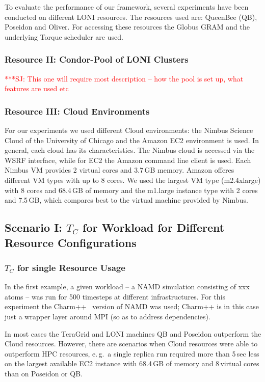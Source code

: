 \documentclass[conference,final]{IEEEtran}
\newcommand{\tc}{$T_{C}$ }
\newcommand{\jhanote}[1]{ {\textcolor{red} { ***SJ: #1 }}}
\newcommand{\jhanote}[1]{}
\begin{document}
To evaluate the performance of our framework, several experiments 
have been conducted on different LONI resources. The resources used are: 
QueenBee (QB), Poseidon and Oliver. For accessing these resources
the Globus GRAM and the underlying Torque scheduler are used.

\subsubsection*{Resource II: Condor-Pool of LONI Clusters}

\jhanote{This one will require most description -- how the pool is set
up, what features are used etc}

\subsubsection*{Resource III: Cloud Environments}

For our experiments we used different Cloud environments: 
the Nimbus Science Cloud of the University of Chicago and the 
Amazon EC2 environment is used. In general, each cloud has 
its characteristics. The Nimbus cloud is accessed via the WSRF
interface, while for EC2 the Amazon command line 
client is used. Each Nimbus VM provides 2 virtual cores and 3.7\,GB memory. 
Amazon offeres different VM types with up to 8 cores. We used 
the largest VM type (m2.4xlarge) with 8 cores and 68.4\,GB of memory
and the m1.large instance type with 2 cores and 7.5\,GB, which compares
best to the virtual machine provided by Nimbus. 

\subsection{Scenario I: \tc for Workload for Different Resource Configurations}

\subsubsection{\tc for single Resource Usage}

In the first example, a given workload -- a NAMD simulation consisting
of xxx atoms -- was run for 500 timesteps at different
infrastructures. For this experiment the Charm++~\cite{871085} version
of NAMD was used; Charm++ is in this case just a wrapper layer around
MPI (so as to address dependencies).

In most cases the TeraGrid and LONI machines QB and Poseidon
outperform the Cloud resources.  However, there are scenarios when
Cloud resources were able to outperform HPC resources, e.\,g.\ a
single replica run required more than 5\,sec less on the largest
available EC2 instance with 68.4\,GB of memory and 8\,virtual cores
than on Poseidon or QB.
\end{document}
